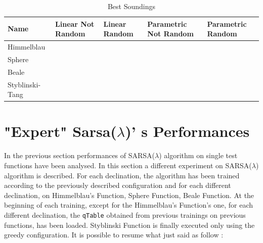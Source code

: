 \begin{table} 
	\centering
	\label{table:BestSoundings}
	\caption{Best Soundings}
	\begin{tabular}
		{l l l l l} \hline Name & Linear Not Random & Linear Random & Parametric Not Random & Parametric Random \\
		\hline Himmelblau & \vtop{\hbox{\strut $2486.938$}\hbox{\strut $(2.67, 1.34)$}\hbox{\strut}\hbox{\strut}} &\cellcolor{blue!25} \vtop{\hbox{\strut $2498.457$}\hbox{\strut $(3.67, -1.57)$}\hbox{\strut}\hbox{\strut}} & \vtop{\hbox{\strut $2485.972$}\hbox{\strut $(-2.1, 3.30)$}\hbox{\strut}\hbox{\strut}} & \vtop{\hbox{\strut $2492.11$}\hbox{\strut $(-2.283, 3.234)$}\hbox{\strut}\hbox{\strut}} \\
		Sphere & \vtop{\hbox{\strut $3484.44$}\hbox{\strut $(-8.8, -0.67)$}\hbox{\strut}\hbox{\strut}} & \vtop{\hbox{\strut $3537.986$}\hbox{\strut $(-3.24, 3.40)$}\hbox{\strut}\hbox{\strut}} &\cellcolor{blue!25} \vtop{\hbox{\strut $3557.722$}\hbox{\strut $(-1.034, -1.099)$}\hbox{\strut}\hbox{\strut}} & \vtop{\hbox{\strut $3553.626$}\hbox{\strut $(1.69, 1.88)$}\hbox{\strut}\hbox{\strut}} \\
		Beale & \vtop{\hbox{\strut $1985.797$}\hbox{\strut $(0, 0)$}\hbox{\strut}\hbox{\strut}} & \vtop{\hbox{\strut $1472.184$}\hbox{\strut $(1.69, 2.269)$}\hbox{\strut}\hbox{\strut}} &\cellcolor{blue!25} \vtop{\hbox{\strut $1997.392$}\hbox{\strut $(-0.77, 1.559)$}\hbox{\strut}\hbox{\strut}} & \vtop{\hbox{\strut $1994.983$}\hbox{\strut $(1.309, -0.89)$}\hbox{\strut}\hbox{\strut}} \\
		Styblinski-Tang & \vtop{\hbox{\strut $5153.086$}\hbox{\strut $(-2.67, -2.67)$}\hbox{\strut}\hbox{\strut}} & \vtop{\hbox{\strut $5126.192$}\hbox{\strut $(3, -2.97)$}\hbox{\strut}\hbox{\strut}} &\cellcolor{blue!25} \vtop{\hbox{\strut $5155.97$}\hbox{\strut $(-2.77, -2.95)$}\hbox{\strut}\hbox{\strut}} & \vtop{\hbox{\strut $5154.053$}\hbox{\strut $(-3.17, -2.99)$}\hbox{\strut}\hbox{\strut}} \\
		\hline
	\end{tabular}
\end{table}

\section{"Expert" Sarsa($\lambda$)' s Performances }

In the previous section performances of SARSA($\lambda$) algorithm on single test functions have been analysed. In this section a different experiment on SARSA($\lambda$) algorithm is described. For each declination, the algorithm has been trained according to the previously described configuration and for each different declination, on Himmelblau's Function, Sphere Function, Beale Function. At the beginning of each training, except for the Himmelblau's Function's one, for each different declination, the {\tt qTable} obtained from previous trainings on previous functions, has been loaded. Styblinski Function is finally executed only using the greedy configuration. It is possible to resume what just said as follow :

